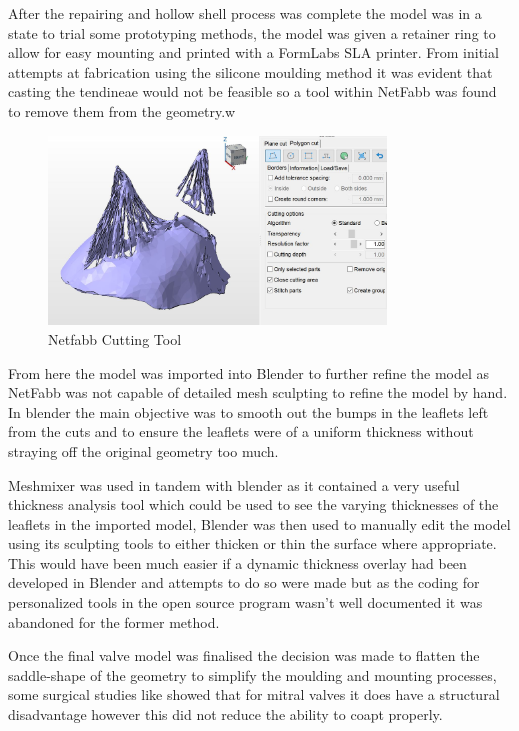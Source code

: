 After the repairing and hollow shell process was complete the model was in a state to trial some prototyping methods, the model was given a retainer ring to allow for easy mounting and printed with a FormLabs \gls{SLA} printer. From initial attempts at fabrication using the silicone moulding method it was evident that casting the tendineae would not be feasible so a tool within NetFabb was found to remove them from the geometry.w
\begin{figure}
    \centering
    \includegraphics[width=0.8\textwidth]{figures/nfcut}
    \caption{Netfabb Cutting Tool}
    \label{fig:Netfabbcut}
\end{figure}

From here the model was imported into Blender to further refine the model as NetFabb was not capable of detailed mesh sculpting to refine the model by hand. In blender the main objective was to smooth out the bumps in the leaflets left from the cuts and to ensure the leaflets were of a uniform thickness without straying off the original geometry too much. 

Meshmixer was used in tandem with blender as it contained a very useful thickness analysis tool which could be used to see the varying thicknesses of the leaflets in the imported model, Blender was then used to manually edit the model using its sculpting tools to either thicken or thin the surface where appropriate. This would have been much easier if a dynamic thickness overlay had been developed in Blender and attempts to do so were made but as the coding for personalized tools in the open source program wasn't well documented it was abandoned for the former method.





Once the final valve model was finalised the decision was made to flatten the saddle-shape of the geometry to simplify the moulding and mounting processes, some surgical studies like  showed that for mitral valves it does have a structural disadvantage however this did not reduce the ability to coapt properly.




